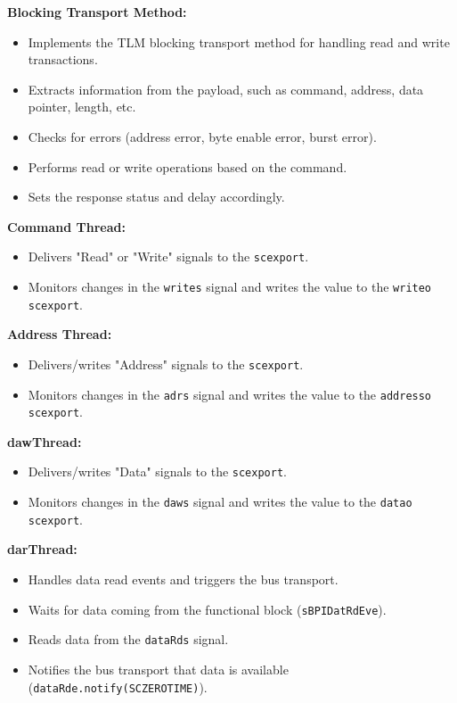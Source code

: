 \documentclass[a4paper,12pt,english]{report}
\begin{document}
\textbf{Blocking Transport Method:}
\begin{itemize}
    \item Implements the TLM blocking transport method for handling read and write transactions.
    \item Extracts information from the payload, such as command, address, data pointer, length, etc.
    \item Checks for errors (address error, byte enable error, burst error).
    \item Performs read or write operations based on the command.
    \item Sets the response status and delay accordingly.
\end{itemize}

\textbf{Command Thread:}
\begin{itemize}
    \item Delivers "Read" or "Write" signals to the \texttt{sc\textunderscore export}.
    \item Monitors changes in the \texttt{write\textunderscore s} signal and writes the value to the \texttt{write\textunderscore o} \texttt{sc\textunderscore export}.
\end{itemize}

\textbf{Address Thread:}
\begin{itemize}
    \item Delivers/writes "Address" signals to the \texttt{sc\textunderscore export}.
    \item Monitors changes in the \texttt{adr\textunderscore s} signal and writes the value to the \texttt{address\textunderscore o} \texttt{sc\textunderscore export}.
\end{itemize}

\textbf{dawThread:}
\begin{itemize}
    \item Delivers/writes "Data" signals to the \texttt{sc\textunderscore export}.
    \item Monitors changes in the \texttt{daw\textunderscore s} signal and writes the value to the \texttt{data\textunderscore o} \texttt{sc\textunderscore export}.
\end{itemize}

\textbf{darThread:}
\begin{itemize}
    \item Handles data read events and triggers the bus transport.
    \item Waits for data coming from the functional block (\texttt{sBPIDatRdEv\textunderscore e}).
    \item Reads data from the \texttt{dataRd\textunderscore s} signal.
    \item Notifies the bus transport that data is available (\texttt{dataRd\textunderscore e.notify(SC\textunderscore ZERO\textunderscore TIME)}).
\end{itemize}
\end{document}
